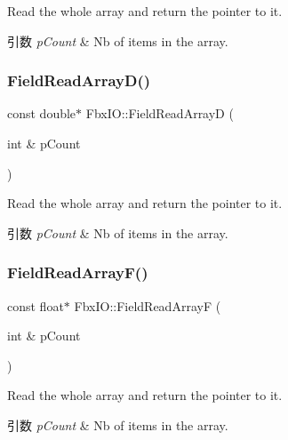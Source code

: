Read the whole array and return the pointer to it. 
\begin{DoxyParams}{引数}
{\em p\+Count} & Nb of items in the array. \\
\hline
\end{DoxyParams}
\mbox{\label{class_fbx_i_o_ac1359003d4072ac2a4a1d8bd6c4b95a7}} 
\subsubsection{\texorpdfstring{Field\+Read\+Array\+D()}{FieldReadArrayD()}}
{\footnotesize\ttfamily const double$\ast$ Fbx\+I\+O\+::\+Field\+Read\+ArrayD (\begin{DoxyParamCaption}\item[{int \&}]{p\+Count }\end{DoxyParamCaption})}

Read the whole array and return the pointer to it. 
\begin{DoxyParams}{引数}
{\em p\+Count} & Nb of items in the array. \\
\hline
\end{DoxyParams}
\mbox{\label{class_fbx_i_o_a52292adedaf6b1ffc357571fe1f896c7}} 
\subsubsection{\texorpdfstring{Field\+Read\+Array\+F()}{FieldReadArrayF()}}
{\footnotesize\ttfamily const float$\ast$ Fbx\+I\+O\+::\+Field\+Read\+ArrayF (\begin{DoxyParamCaption}\item[{int \&}]{p\+Count }\end{DoxyParamCaption})}

Read the whole array and return the pointer to it. 
\begin{DoxyParams}{引数}
{\em p\+Count} & Nb of items in the array. \\
\hline
\end{DoxyParams}
\mbox{\label{class_fbx_i_o_aa04fbcb38ce5fd8cf4b20d992c87f1ad}} 
